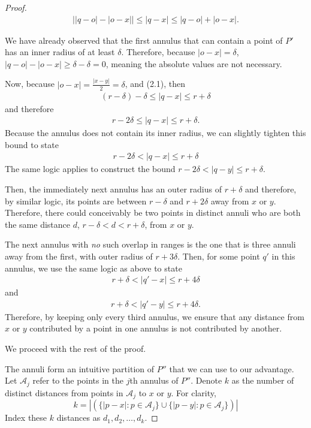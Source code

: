 \documentclass{scrippsthesisclass}
\theoremstyle{definition}
\begin{document}
\begin{proof}
    \begin{align}
        \left| |q-o| - |o-x| \right| \leq |q - x| \leq |q-o| + |o-x|.
    \end{align}

    We have already observed that the first annulus that can contain a point of $P'$ has an inner radius of at least $\delta$.
    Therefore, because $|o - x| = \delta$, $|q - o| - |o - x| \geq \delta - \delta = 0$, meaning the absolute values are not necessary.

    Now, because $|o-x| = \frac{|x-y|}{2} = \delta$, and (2.1), then 
    \begin{align}
        (r-\delta) - \delta \leq |q - x| \leq r + \delta
    \end{align}
    and therefore
    \begin{align}
        r - 2\delta \leq |q - x| \leq r + \delta.
    \end{align}
    Because the annulus does not contain its inner radius, we can slightly tighten this bound to state
    \begin{align}
        r - 2\delta < |q - x| \leq r + \delta
    \end{align}
    The same logic applies to construct the bound $r - 2\delta < |q - y| \leq r + \delta$. 

    Then, the immediately next annulus has an outer radius of $r + \delta$ and therefore, by similar logic, its points are between $r - \delta$ and $r + 2\delta$ away from $x$ or $y$.
    Therefore, there could conceivably be two points in distinct annuli who are both the same distance $d$, $r - \delta < d < r + \delta$, from $x$ or $y$.

    The next annulus with \textit{no} such overlap in ranges is the one that is three annuli away from the first, with outer radius of $r + 3\delta$.
    Then, for some point $q'$ in this annulus, we use the same logic as above to state
    \begin{align}
        r + \delta < |q' - x| \leq r + 4\delta
    \end{align}
    and
    \begin{align}
        r + \delta < |q' - y| \leq r + 4\delta.
    \end{align}
    Therefore, by keeping only every third annulus, we ensure that any distance from $x$ or $y$ contributed by a point in one annulus is not contributed by another. 

    We proceed with the rest of the proof. 

    The annuli form an intuitive partition of $P''$ that we can use to our advantage.
    Let $\mathcal{A}_j$ refer to the points in the $j$th annulus of $P''$. 
    Denote $k$ as the number of distinct distances from points in $\mathcal{A}_j$ to $x$ or $y$.
    For clarity, 
    \[
    k = \left|\left(\{|p - x|: p \in \mathcal{A}_j\} \cup \{|p - y|: p \in \mathcal{A}_j \}\right)\right|
    \]
    Index these $k$ distances as $d_1, d_2, \dots, d_k$. 


\end{proof}
\end{document}
